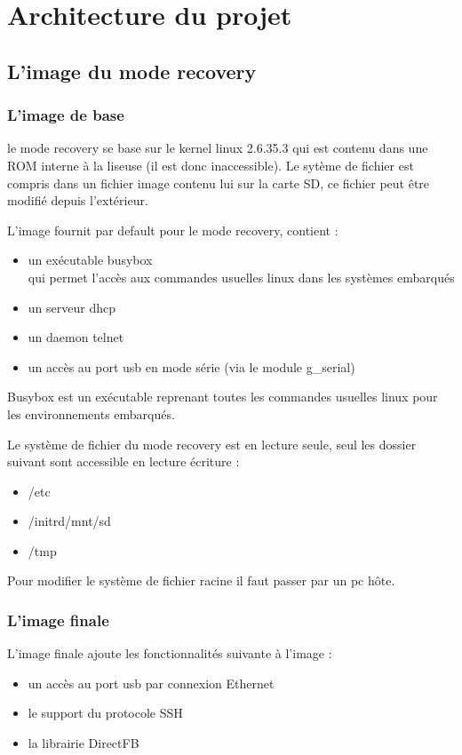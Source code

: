 \chapter{Architecture du projet}

\section{L'image du mode recovery}

\subsection{L'image de base}
le mode recovery se base sur le kernel linux 2.6.35.3 qui est contenu dans une ROM interne à la liseuse (il est donc inaccessible). Le sytème de fichier est compris dans un fichier image contenu lui sur la carte SD, ce fichier peut être modifié depuis l'extérieur.

L'image fournit par default pour le mode recovery, contient : 
\begin{itemize}
	\item un exécutable busybox \\
		qui permet l'accès aux commandes usuelles linux dans les systèmes embarqués
	\item un serveur dhcp
	\item un daemon telnet
	\item un accès au port usb en mode série (via le module g_serial)
\end{itemize}

Busybox est un exécutable reprenant toutes les commandes usuelles linux pour les environnements
embarqués.

Le système de fichier du mode recovery est en lecture seule, seul les dossier suivant sont accessible en lecture écriture : 
\begin{itemize}
	\item /etc
	\item /initrd/mnt/sd
	\item /tmp
\end{itemize}

Pour modifier le système de fichier racine il faut passer par un pc hôte.

\subsection{L'image finale}

L'image finale ajoute les fonctionnalités suivante à l'image : 
	\begin{itemize}
		\item un accès au port usb par connexion Ethernet
		\item le support du protocole SSH
		\item la librairie DirectFB
	\end{itemize}

